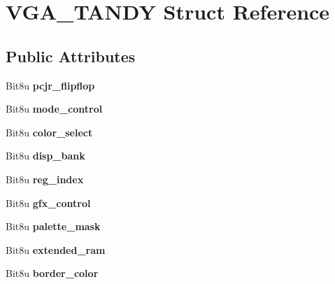 \hypertarget{structVGA__TANDY}{\section{V\-G\-A\-\_\-\-T\-A\-N\-D\-Y Struct Reference}
\label{structVGA__TANDY}
}
\subsection*{Public Attributes}
\begin{DoxyCompactItemize}
\item 
\hypertarget{structVGA__TANDY_a9b2874b4edce969b535894a3cfcb1151}{Bit8u {\bfseries pcjr\-\_\-flipflop}}\label{structVGA__TANDY_a9b2874b4edce969b535894a3cfcb1151}

\item 
\hypertarget{structVGA__TANDY_a4360a01849c607610d48db921f202e88}{Bit8u {\bfseries mode\-\_\-control}}\label{structVGA__TANDY_a4360a01849c607610d48db921f202e88}

\item 
\hypertarget{structVGA__TANDY_a8e0fc58e4aa2ce550c216514a2305b39}{Bit8u {\bfseries color\-\_\-select}}\label{structVGA__TANDY_a8e0fc58e4aa2ce550c216514a2305b39}

\item 
\hypertarget{structVGA__TANDY_a919bf651a4a7d4275805fbfe0ea05605}{Bit8u {\bfseries disp\-\_\-bank}}\label{structVGA__TANDY_a919bf651a4a7d4275805fbfe0ea05605}

\item 
\hypertarget{structVGA__TANDY_a056ddb85595350efe2fd37ca785303b7}{Bit8u {\bfseries reg\-\_\-index}}\label{structVGA__TANDY_a056ddb85595350efe2fd37ca785303b7}

\item 
\hypertarget{structVGA__TANDY_a78532a81565050b8962a40fa07683b42}{Bit8u {\bfseries gfx\-\_\-control}}\label{structVGA__TANDY_a78532a81565050b8962a40fa07683b42}

\item 
\hypertarget{structVGA__TANDY_a6f40bc19949a29d913843d403190a5a3}{Bit8u {\bfseries palette\-\_\-mask}}\label{structVGA__TANDY_a6f40bc19949a29d913843d403190a5a3}

\item 
\hypertarget{structVGA__TANDY_a75cda7d595546ecc8d56047c3930e2f0}{Bit8u {\bfseries extended\-\_\-ram}}\label{structVGA__TANDY_a75cda7d595546ecc8d56047c3930e2f0}

\item 
\hypertarget{structVGA__TANDY_a0ce55f8e821c78f6e6bbb840829799a1}{Bit8u {\bfseries border\-\_\-color}}\label{structVGA__TANDY_a0ce55f8e821c78f6e6bbb840829799a1}


\end{DoxyCompactItemize}
